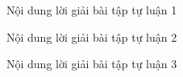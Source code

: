 \begin{loigiaibt}{1}
 Nội dung lời giải bài tập tự luận 1 
\end{loigiaibt}
\begin{loigiaibt}{2}
 Nội dung lời giải bài tập tự luận 2 
\end{loigiaibt}
\begin{loigiaibt}{3}
 Nội dung lời giải bài tập tự luận 3 
\end{loigiaibt}
